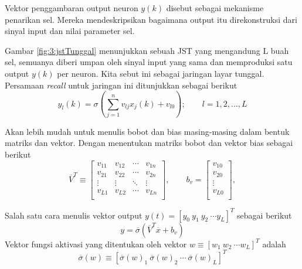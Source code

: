 Vektor penggambaran output neuron $y(k)$ disebut sebagai mekanisme penarikan sel. Mereka mendeskripsikan bagaimana output itu direkonstruksi dari sinyal input dan nilai parameter sel.

Gambar \ref{fig:3:jstTunggal} menunjukkan sebuah JST yang mengandung L buah sel, semuanya diberi umpan oleh sinyal input yang sama dan memproduksi satu output $y(k)$ per neuron. Kita sebut ini sebagai jaringan layar tunggal. Persamaan \textit{recall} untuk jaringan ini ditunjukkan sebagai berikut
\vspace{0em}
\begin{equation} \label{eq:3:recall}
y_l(k) = \sigma \left( \sum_{j=1}^{n}v_{lj}x_j(k)+v_{l0} \right); \qquad l = 1,2,...,L
\end{equation}

Akan lebih mudah untuk menulis bobot dan bias masing-masing dalam bentuk matriks dan vektor. Dengan menentukan matriks bobot dan vektor bias sebagai berikut
\vspace{-1em}
\begin{equation} \label{eq:3:weightVector}
\overline{V}^T \equiv
\left[
\begin{matrix}
v_{11} & v_{12} & \cdots & v_{1n} \\
v_{21} & v_{22} & \cdots & v_{2n} \\
\vdots & \vdots & \ddots & \vdots \\
v_{L1} & v_{L2} & \cdots & v_{Ln} \\
\end{matrix}
\right], \qquad
b_v = 
\left[
\begin{matrix}
v_{10} \\
v_{20} \\
\vdots \\
v_{L0} \\
\end{matrix}
\right],
\end{equation}

\noindent Salah satu cara menulis vektor output $y(t) = [y_0\ y_1\ y_2\ \cdots y_L]^T$ sebagai berikut
\vspace{-1em}
\begin{equation} \label{eq:3:outputVector}
y = \overline{\sigma}(\overline{V}^T\overline{x}+b_v)
\end{equation}
\noindent Vektor fungsi aktivasi yang ditentukan oleh vektor $w\equiv [w_1\ w_2\ \cdots w_L]^T$ adalah
\vspace{-1em}
\begin{equation} \label{eq:3:activation}
\overline{\sigma}(w)\equiv [\overline{\sigma}(w)_1\ \overline{\sigma}(w)_2\ \cdots\ \overline{\sigma}(w)_L]^T
\end{equation}

